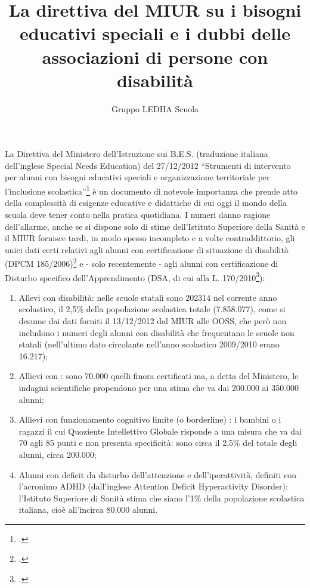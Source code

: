 \author{Gruppo LEDHA Scuola}
\title{La  direttiva  del  MIUR  su i bisogni educativi speciali e i dubbi delle associazioni di persone con disabilità}
\label{cha:ledha110213}

\maketitle
{}
La Direttiva del Ministero dell'Istruzione sui B.E.S. (traduzione italiana dell'inglese Special Needs
Education) del 27/12/2012 “Strumenti di intervento per alunni con bisogni educativi speciali e
organizzazione territoriale per l'inclusione scolastica”\footcite{dir27Dic2012}
 è un documento di notevole importanza che prende
atto della complessità di esigenze educative e didattiche di cui oggi il mondo della scuola deve
tener conto nella pratica quotidiana.
I numeri danno ragione dell'allarme, anche se si dispone solo di stime dell'Istituto Superiore della
Sanità e il MIUR fornisce tardi, in modo spesso incompleto e a volte contraddittorio, gli unici dati
certi relativi agli alunni con certificazione di situazione di disabilità (DPCM 185/2006)\footcite{DPCM22_02_06_N_185} e - solo
recentemente - agli alunni con certificazione di Disturbo specifico dell'Apprendimento (DSA, di
cui alla L. 170/2010\footcite{legge170}):
\begin{enumerate}
	\item  Allevi con disabilità: nelle scuole statali sono 202314 nel corrente anno scolastico, il 2,5\%
	della popolazione scolastica totale (7.858.077), come si desume dai dati  forniti il
	13/12/2012 dal MIUR alle OOSS, che però non includono i numeri degli alunni con
	disabilità che frequentano le scuole non statali (nell'ultimo dato circolante nell'anno
	scolastico 2009/2010 erano 16.217);
	\item Allievi con : sono 70.000 quelli finora certificati ma, a detta del Ministero, le indagini
	scientifiche propendono per una stima che va dai 200.000 ai 350.000 alunni;
	\item Allievi con funzionamento cognitivo limite (o borderline) : i bambini o i ragazzi il cui
	Quoziente Intellettivo Globale risponde a una misura che va dai 70 agli 85 punti e non
	presenta specificità: sono circa il 2,5\% del totale degli alunni, circa 200.000;
	\item  Alunni con deficit da disturbo dell'attenzione e dell'iperattività, definiti con l’acronimo
	ADHD (dall'inglese Attention Deficit Hyperactivity Disorder): l'Istituto Superiore di Sanità
	stima che siano l’1\% della popolazione scolastica italiana, cioè all'incirca 80.000 alunni.
\end{enumerate}

